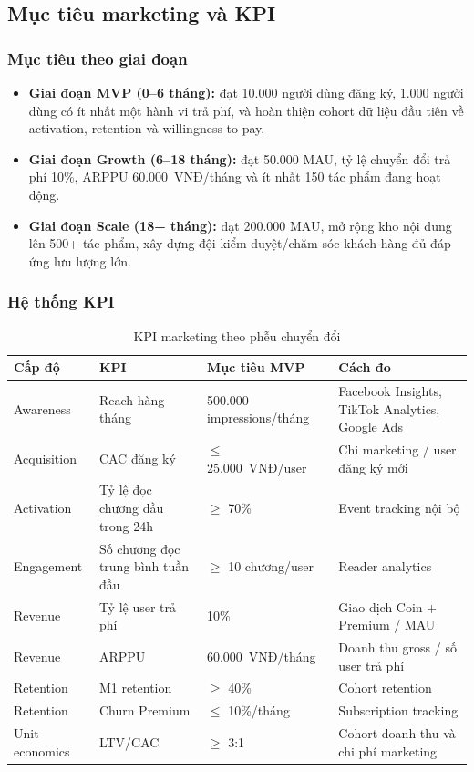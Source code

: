 \subsection{Mục tiêu marketing và KPI}

\subsubsection{Mục tiêu theo giai đoạn}

\begin{itemize}
    \item \textbf{Giai đoạn MVP (0--6 tháng):} đạt 10.000 người dùng đăng ký, 1.000 người dùng có ít nhất một hành vi trả phí, và hoàn thiện cohort dữ liệu đầu tiên về activation, retention và willingness-to-pay.
    \item \textbf{Giai đoạn Growth (6--18 tháng):} đạt 50.000 MAU, tỷ lệ chuyển đổi trả phí 10\%, ARPPU 60.000~VNĐ/tháng và ít nhất 150 tác phẩm đang hoạt động.
    \item \textbf{Giai đoạn Scale (18+ tháng):} đạt 200.000 MAU, mở rộng kho nội dung lên 500+ tác phẩm, xây dựng đội kiểm duyệt/chăm sóc khách hàng đủ đáp ứng lưu lượng lớn.
\end{itemize}

\subsubsection{Hệ thống KPI}

\begin{table}[htbp]
\centering
\caption{KPI marketing theo phễu chuyển đổi}
\label{tab:kpis}
\renewcommand{\arraystretch}{1.25}
\small
\begin{tabular}{|L{2.5cm}|L{3.8cm}|L{3.5cm}|L{3.5cm}|}
\hline
\textbf{Cấp độ} & \textbf{KPI} & \textbf{Mục tiêu MVP} & \textbf{Cách đo} \\
\hline
Awareness
& Reach hàng tháng
& 500.000 impressions/tháng
& Facebook Insights, TikTok Analytics, Google Ads \\
\hline
Acquisition
& CAC đăng ký
& $\leq$ 25.000~VNĐ/user
& Chi marketing / user đăng ký mới \\
\hline
Activation
& Tỷ lệ đọc chương đầu trong 24h
& $\geq$ 70\%
& Event tracking nội bộ \\
\hline
Engagement
& Số chương đọc trung bình tuần đầu
& $\geq$ 10 chương/user
& Reader analytics \\
\hline
Revenue
& Tỷ lệ user trả phí
& 10\%
& Giao dịch Coin + Premium / MAU \\
\hline
Revenue
& ARPPU
& 60.000~VNĐ/tháng
& Doanh thu gross / số user trả phí \\
\hline
Retention
& M1 retention
& $\geq$ 40\%
& Cohort retention \\
\hline
Retention
& Churn Premium
& $\leq$ 10\%/tháng
& Subscription tracking \\
\hline
Unit economics
& LTV/CAC
& $\geq$ 3:1
& Cohort doanh thu và chi phí marketing \\
\hline
\end{tabular}
\end{table}

